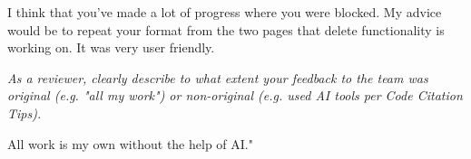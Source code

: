 \documentclass{article}
\begin{document}
\begin{tcolorbox}[colback=secondarycolor, colframe=primarycolor, title=\textbf{Step 4: Peer Review 2 - Jacob Hopkins}]
\vspace{0.05cm}
I think that you’ve made a lot of progress where you were blocked. My advice would be to repeat your format from the two pages that delete functionality is working on. It was very user friendly.

\vspace{0.2cm}
\textit{As a reviewer, clearly describe to what extent your feedback to the team was original (e.g. "all my work") or non-original (e.g. used AI tools per Code Citation Tips). }

\vspace{0.05cm}
All work is my own without the help of AI."

\end{tcolorbox}

\vspace{0.2cm}
\end{document}
